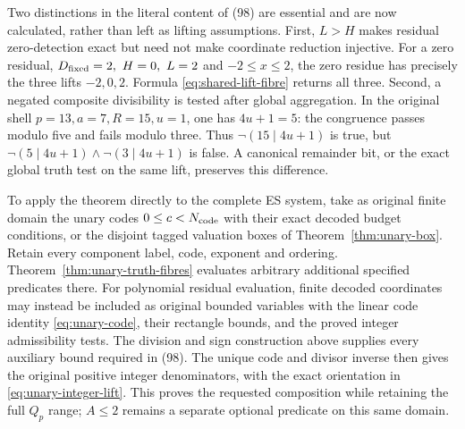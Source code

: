 Two distinctions in the literal content of (98) are essential
and are now calculated, rather than left as lifting assumptions.
First, \(L>H\) makes residual zero-detection exact but need not
make coordinate reduction injective.  For a zero residual,
\(D_{\rm fixed}=2,\ H=0,\ L=2\) and \(-2\le x\le2\),
the zero residue has precisely the three lifts \(-2,0,2\).
Formula \eqref{eq:shared-lift-fibre} returns all three.
Second, a negated composite divisibility is tested after
global aggregation.  In the original shell
\(p=13,a=7,R=15,u=1\), one has \(4u+1=5\):
the congruence passes modulo five and fails modulo three.
Thus \(\neg(15\mid4u+1)\) is true, but
\(\neg(5\mid4u+1)\land\neg(3\mid4u+1)\) is false.
A canonical remainder bit, or the exact global truth
test on the same lift, preserves this difference.

To apply the theorem directly to the complete ES system,
take as original finite domain the unary codes
\(0\le c<N_{\rm code}\) with their exact decoded budget
conditions, or the disjoint tagged valuation boxes of
Theorem~\ref{thm:unary-box}.  Retain every component label,
code, exponent and ordering.  Theorem~\ref{thm:unary-truth-fibres}
evaluates arbitrary additional specified predicates there.
For polynomial residual evaluation, finite decoded
coordinates may instead be included as original bounded
variables with the linear code identity
\eqref{eq:unary-code}, their rectangle bounds, and the
proved integer admissibility tests.
The division and sign construction above supplies every
auxiliary bound required in (98).
The unique code and divisor inverse then gives the original
positive integer denominators, with the exact orientation
in \eqref{eq:unary-integer-lift}.
This proves the requested composition while retaining the
full \(Q_p\) range; \(A\le2\) remains a separate optional
predicate on this same domain.
